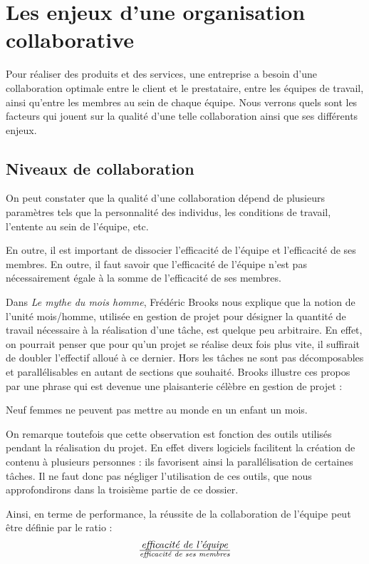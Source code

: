 \chapter{Les enjeux d'une organisation collaborative}

Pour réaliser des produits et des services, une entreprise a besoin d'une collaboration optimale entre le client et le prestataire, entre les équipes de travail, ainsi qu'entre les membres au sein de chaque équipe. Nous verrons quels sont les facteurs qui jouent sur la qualité d'une telle collaboration ainsi que ses différents enjeux.

\section{Niveaux de collaboration}

On peut constater que la qualité d'une collaboration dépend de plusieurs paramètres tels que la personnalité des individus, les conditions de travail, l'entente au sein de l'équipe, etc.

En outre, il est important de dissocier l'efficacité de l'équipe et l'efficacité de ses membres. En outre, il faut savoir que l'efficacité de l'équipe n'est pas nécessairement égale à la somme de l'efficacité de ses membres.

Dans \textit{Le mythe du mois homme}, Frédéric Brooks nous explique que la notion de l'unité mois/homme, utilisée en gestion de projet pour désigner la quantité de travail nécessaire à la réalisation d'une tâche, est quelque peu arbitraire. En effet, on pourrait penser que pour qu'un projet se réalise deux fois plus vite, il suffirait de doubler l'effectif alloué à ce dernier. Hors les tâches ne sont pas décomposables et parallélisables en autant de sections que souhaité. Brooks illustre ces propos par une phrase qui est devenue une plaisanterie célèbre en gestion de projet : \begin{Quote}Neuf femmes ne peuvent pas mettre au monde en un enfant un mois.\end{Quote}

On remarque toutefois que cette observation est fonction des outils utilisés pendant la réalisation du projet. En effet divers logiciels facilitent la création de contenu à plusieurs personnes : ils favorisent ainsi la parallélisation de certaines tâches. Il ne faut donc pas négliger l'utilisation de ces outils, que nous approfondirons dans la troisième partie de ce dossier.

Ainsi, en terme de performance, la réussite de la collaboration de l'équipe peut être définie par le ratio : \[\text{\textit{efficacité de l'équipe}} \over \text{\textit{efficacité de ses membres}}\]

